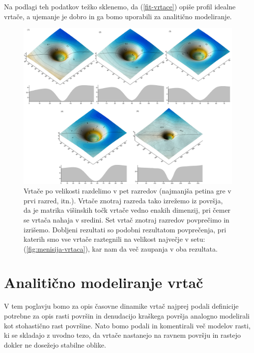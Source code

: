 \documentclass[a4paper, twoside, 12pt]{book}
\begin{document}
  Na podlagi teh podatkov težko sklenemo, da (\ref{fit-vrtace}) opiše profil idealne vrtače, a ujemanje je dobro in ga bomo uporabili za analitično modeliranje.

  \begin{figure}[h!]
    \begin{center}
      \includegraphics[width=17cm,angle=90]{slike/vrtace-po-razredih-menisija}
    \end{center}
    \caption{Vrtače po velikosti razdelimo v pet razredov (najmanjša petina gre v prvi razred, itn.). Vrtače znotraj razreda tako izrežemo iz površja, da je matrika višinskih točk vrtače vedno enakih dimenzij, pri čemer se vrtača nahaja v sredini. Set vrtač znotraj razredov povprečimo in izrišemo. Dobljeni rezultati so podobni rezultatom povprečenja, pri katerih smo vse vrtače raztegnili na velikost največje v setu: (\ref{fig:menisija-vrtaca}), kar nam da več zaupanja v oba rezultata.}
    \label{fig:menisija-vrtace-po-razredih}
  \end{figure}


  \chapter{Analitično modeliranje vrtač}
  \label{analiticno-modeliranje}

V tem poglavju bomo za opis časovne dinamike vrtač najprej podali definicije potrebne za opis rasti površin in denudacijo kraškega površja analogno modelirali kot stohastično rast površine. Nato bomo podali in komentirali več modelov rasti, ki se skladajo z uvodno tezo, da vrtače nastanejo na ravnem površju in rastejo dokler ne dosežejo stabilne oblike.
\end{document}

